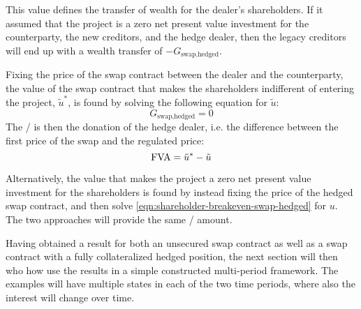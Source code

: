 \documentclass[main.tex]{subfiles}
\begin{document}
        This value defines the transfer of wealth for the dealer's shareholders.
        If it assumed that the project is a zero net present value investment for the counterparty, the new creditors, and the hedge dealer,
        then the legacy creditors will end up with a wealth transfer of $-G_{\text{swap,hedged}}$.

        Fixing the price of the swap contract between the dealer and the counterparty,
        the value of the swap contract that makes the shareholders indifferent of entering the project, $\tilde{u}^{\ast}$,
        is found by solving the following equation for $\tilde{u}$:
        \begin{equation}
            G_{\text{swap,hedged}} = 0
            \label{eqn:shareholder-breakeven-swap-hedged}
        \end{equation}
        The \FVA/ is then the donation of the hedge dealer, i.e. the difference between the first price of the swap and the regulated price:
        \begin{equation}
            \FVA/ = \tilde{u}^{\ast} - \tilde{u}
        \end{equation}

        Alternatively, the value that makes the project a zero net present value investment for the shareholders is found by instead fixing the price of the hedged swap contract,
        and then solve \cref{eqn:shareholder-breakeven-swap-hedged}
        for $u$.
        The two approaches will provide the same \FVA/ amount.

        Having obtained a result for both an unsecured swap contract as well as a swap contract with a fully collateralized hedged position,
        the next section will then who how use the results in a simple constructed multi-period framework.
        The examples will have multiple states in each of the two time periods, where also the interest will change over time.
\end{document}
